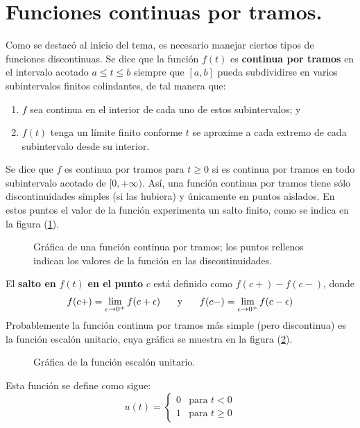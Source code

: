 \section{Funciones continuas por tramos.}
Como se destacó al inicio del tema, es necesario manejar ciertos tipos de funciones discontinuas. Se dice que la función $f(t)$ es \textbf{continua por tramos} en el intervalo acotado $a \leq t \leq b$ siempre que $[a, b]$ pueda subdividirse en varios subintervalos finitos colindantes, de tal manera que:
\begin{enumerate}
\item $f$ sea continua en el interior de cada uno de estos subintervalos; y
\item $f(t)$ tenga un límite finito conforme $t$ se aproxime a cada extremo de cada subintervalo desde su interior.
\end{enumerate}
Se dice que $f$ es continua por tramos para $t \geq 0$ si es continua por tramos en todo subintervalo acotado de $[0, +\infty)$. Así, una función continua por tramos tiene sólo discontinuidades simples (si las hubiera) y únicamente en puntos aislados. En estos puntos el valor de la función experimenta un salto finito, como se indica en la figura (\ref{fig:figura_07_01_03}).
\begin{figure}[!ht]
    \centering
    
    \caption{Gráfica de una función continua por tramos; los puntos rellenos indican los valores de la función en las discontinuidades.}
    \label{fig:figura_07_01_03}
\end{figure}
 El \textbf{salto en} $f(t)$ \textbf{en el punto} $c$ está definido como $f(c+) - f(c-)$, donde
 \begin{align*}
f(c+) = \lim_{\epsilon \to 0^{+}} f (c + \epsilon) \hspace{0.5cm} \mbox{ y } \hspace{0.5cm} f(c-) = \lim_{\epsilon \to 0^{+}} f (c - \epsilon)
\end{align*}
Probablemente la función continua por tramos más simple (pero discontinua) es la función escalón unitario, cuya gráfica se muestra en la figura (\ref{fig:figura_07_01_04}).
\begin{figure}[!ht]
\centering

\caption{Gráfica de la función escalón unitario.}
\label{fig:figura_07_01_04}
\end{figure}
Esta función se define como sigue:
\begin{equation}
u(t) = \begin{cases}
0 & \mbox{para } t < 0 \\
1 & \mbox{para } t \geq 0
\end{cases}
\label{eq:019}
\end{equation}
